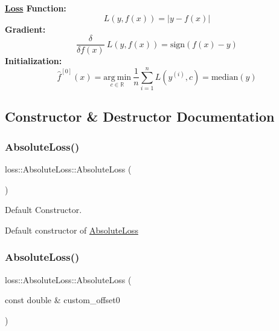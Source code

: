 {\bfseries \mbox{\hyperlink{classloss_1_1_loss}{Loss}} Function\+:} \[ L(y, f(x)) = \left| y - f(x) \right| \] {\bfseries Gradient\+:} \[ \frac{\delta}{\delta f(x)}\ L(y, f(x)) = \mathrm{sign}\left( f(x) - y \right) \] {\bfseries Initialization\+:} \[ \hat{f}^{[0]}(x) = \underset{c\in\mathbb{R}}{\mathrm{arg~min}}\ \frac{1}{n}\sum\limits_{i=1}^n L\left(y^{(i)}, c\right) = \mathrm{median}(y) \] 

\subsection{Constructor \& Destructor Documentation}
\mbox{\label{classloss_1_1_absolute_loss_a4b1416147d0573079f9d652097c1ab81}} 
\subsubsection{\texorpdfstring{Absolute\+Loss()}{AbsoluteLoss()}\hspace{0.1cm}{\footnotesize\ttfamily [1/2]}}
{\footnotesize\ttfamily loss\+::\+Absolute\+Loss\+::\+Absolute\+Loss (\begin{DoxyParamCaption}{ }\end{DoxyParamCaption})}



Default Constructor. 

Default constructor of {\ttfamily \mbox{\hyperlink{classloss_1_1_absolute_loss}{Absolute\+Loss}}} \mbox{\label{classloss_1_1_absolute_loss_a3e056fbde0b63527bb9aadb0a4a8547a}} 
\subsubsection{\texorpdfstring{Absolute\+Loss()}{AbsoluteLoss()}\hspace{0.1cm}{\footnotesize\ttfamily [2/2]}}
{\footnotesize\ttfamily loss\+::\+Absolute\+Loss\+::\+Absolute\+Loss (\begin{DoxyParamCaption}\item[{const double \&}]{custom\+\_\+offset0 }\end{DoxyParamCaption})}



